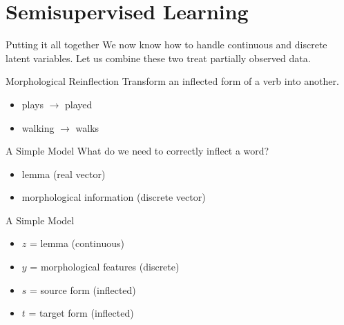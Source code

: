 \documentclass[14pt]{beamer}
\begin{document}
\section{Semisupervised Learning}

\begin{frame}{Putting it all together}
We now know how to handle continuous and discrete latent variables. Let us combine these two treat partially observed data.
\pause
\begin{block}{Morphological Reinflection}
Transform an inflected form of a verb into another.
\begin{itemize}
\pause
\item plays $ \rightarrow $ played
\pause
\item walking $ \rightarrow $ walks
\end{itemize}
\end{block}
\end{frame}

\begin{frame}{A Simple Model \citep{ZhouNeubig:2017}}
What do we need to correctly inflect a word?
\pause
\begin{itemize}
\item lemma \pause (real vector)
\pause
\item morphological information \pause (discrete vector)
\end{itemize}
\end{frame}

\begin{frame}{A Simple Model \citep{ZhouNeubig:2017}}
\begin{figure}
\center
{}
\end{figure}
\begin{itemize}
\item $ z $ = lemma (continuous)
\item $ y $ = morphological features (discrete)
\item $ s $ = source form (inflected)
\item $ t $ = target form (inflected)
\end{itemize}
\end{frame}
\end{document}
